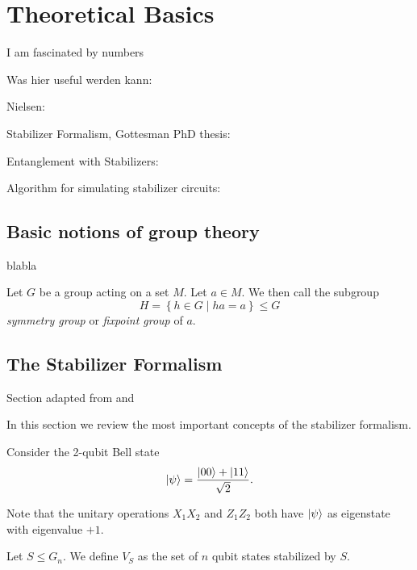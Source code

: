 \chapter{Theoretical Basics}
\label{ch:basics}
\epigraph{I am fascinated by numbers}{
\citeauthor{baron-cohenAutismSpectrumQuotientAQ2001}}

Was hier useful werden kann:

Nielsen: \cite{nielsenQuantumComputationQuantum2010}

Stabilizer Formalism, Gottesman PhD thesis: \cite{gottesmanStabilizerCodesQuantum1997}

Entanglement with Stabilizers: \cite{fattalEntanglementStabilizerFormalism2004}

Algorithm for simulating stabilizer circuits:
\cite{aaronsonImprovedSimulationStabilizer2004}

\section{Basic notions of group theory}
blabla

\begin{defn}\label{defn:fixpointgroup}
  Let $G$ be a group acting on a set $M$. Let $a\in M$. We then call the
  subgroup
  \[ H = \left\{ h \in G \mid ha = a \right\} \leq G \]
  \emph{symmetry group} or \emph{fixpoint group} of $a$.
\end{defn}

\section{The Stabilizer Formalism}\label{sec:basics-stab}
Section adapted from \cite{nielsenQuantumComputationQuantum2010} and
\cite{gottesmanStabilizerCodesQuantum1997}

In this section we review the most important concepts of the stabilizer
formalism. 

Consider the 2-qubit Bell state
\begin{align}
  \ket{\psi} = \frac{\ket{00} + \ket{11}}{\sqrt{2}} 
.\end{align}

Note that the unitary operations $X_1 X_2$ and $Z_1 Z_2$ both have $\ket{\psi}$
as eigenstate with eigenvalue $+1$.



\begin{defn}
  Let $S\leq G_n$. We define $V_S$ as the set of $n$ qubit states stabilized by
  $S$.
\end{defn}
